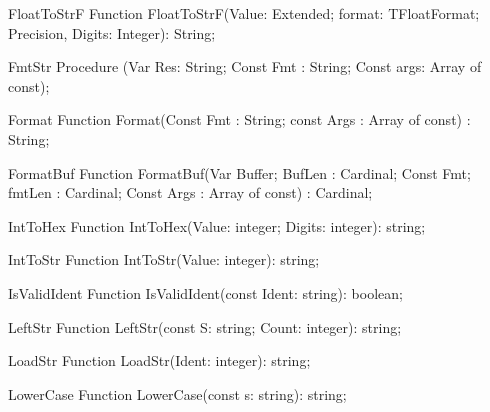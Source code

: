  
\begin{function}{FloatToStrF}
\Declaration
Function FloatToStrF(Value: Extended; format: TFloatFormat; Precision, Digits: Integer): String;
\Description
\Errors
\SeeAlso
\end{function}

 
\begin{procedure}{FmtStr}
\Declaration
Procedure (Var Res: String; Const Fmt : String; Const args: Array of const);
\Description
\Errors
\SeeAlso
\end{procedure}

 
\begin{function}{Format}
\Declaration
Function Format(Const Fmt : String; const Args : Array of const) : String;
\Description
\Errors
\SeeAlso
\end{function}

 
\begin{function}{FormatBuf}
\Declaration
Function FormatBuf(Var Buffer; BufLen : Cardinal; Const Fmt; fmtLen : Cardinal; Const Args : Array of const) : Cardinal;
\Description
\Errors
\SeeAlso
\end{function}

 
\begin{function}{IntToHex}
\Declaration
Function IntToHex(Value: integer; Digits: integer): string;
\Description
\Errors
\SeeAlso
\end{function}

 
\begin{function}{IntToStr}
\Declaration
Function IntToStr(Value: integer): string;
\Description
\Errors
\SeeAlso
\end{function}

 
\begin{function}{IsValidIdent}
\Declaration
Function IsValidIdent(const Ident: string): boolean;
\Description
\Errors
\SeeAlso
\end{function}

 
\begin{function}{LeftStr}
\Declaration
Function LeftStr(const S: string; Count: integer): string;
\Description
\Errors
\SeeAlso
\end{function}

 
\begin{function}{LoadStr}
\Declaration
Function LoadStr(Ident: integer): string;
\Description
\Errors
\SeeAlso
\end{function}

 
\begin{function}{LowerCase}
\Declaration
Function LowerCase(const s: string): string;
\Description
\Errors
\SeeAlso
\end{function}


